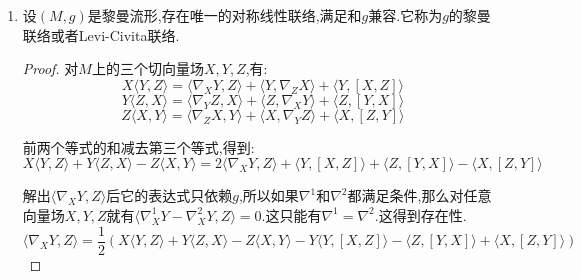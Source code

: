 \begin{enumerate}
    这是一个$(1,2)$型张量场(双线性映射$V\times V\to V$理解为$(1,2)$型张量场因为可以视为$V^*\times V\times V\to\mathbb{R}$的多重线性映射),称为$\nabla$的挠张量(torsion tensor).如果仿射联络$\nabla$的挠张量处处为零,就称$\nabla$是对称的或者无挠的(torsion-free).有如下互相等价的命题:
    \begin{enumerate}
    	\item $\nabla$是对称的.
    	\item $\nabla$关于坐标标架的克里斯托菲尔符号是对称的,即$\Gamma_{ij}^k=\Gamma_{ji}^k$(但是对非坐标标架可能不是对称的).
    	\item 对任意$M$上的光滑函数$u$,有$\nabla^2u$(共变Hessian)是对称$(0,2)$张量场.
    \end{enumerate}
    \begin{proof}
    	
    	(a)和(b)等价性.局部坐标下$\nabla$的挠张量可以写作$T_{ij}^k\partial_k\otimes\mathrm{d}x^i\otimes\mathrm{d}x^j$.这里$T_{ij}^k=\mathrm{d}x^k\left(\nabla_{\partial_i}\partial_j-\nabla_{\partial_j}\partial_i-[\partial_i,\partial_j]\right)=\Gamma_{ij}^k-\Gamma_{ji}^k$.
    \end{proof}
    \item 设$(M,g)$是黎曼流形,存在唯一的对称线性联络,满足和$g$兼容.它称为$g$的黎曼联络或者Levi-Civita联络.
    \begin{proof}
    	
    	对$M$上的三个切向量场$X,Y,Z$,有:
    	$$X\langle Y,Z\rangle=\langle\nabla_XY,Z\rangle+\langle Y,\nabla_ZX\rangle+\langle Y,[X,Z]\rangle$$
    	$$Y\langle Z,X\rangle=\langle\nabla_YZ,X\rangle+\langle Z,\nabla_XY\rangle+\langle Z,[Y,X]\rangle$$
    	$$Z\langle X,Y\rangle=\langle\nabla_ZX,Y\rangle+\langle X,\nabla_YZ\rangle+\langle X,[Z,Y]\rangle$$
    	
    	前两个等式的和减去第三个等式,得到:
    	$$X\langle Y,Z\rangle+Y\langle Z,X\rangle-Z\langle X,Y\rangle=2\langle\nabla_XY,Z\rangle+\langle Y,[X,Z]\rangle+\langle Z,[Y,X]\rangle-\langle X,[Z,Y]\rangle$$
    	
    	解出$\langle\nabla_XY,Z\rangle$后它的表达式只依赖$g$,所以如果$\nabla^1$和$\nabla^2$都满足条件,那么对任意向量场$X,Y,Z$就有$\langle\nabla_X^1Y-\nabla_X^2Y,Z\rangle=0$.这只能有$\nabla^1=\nabla^2$.这得到存在性.
    	$$\langle\nabla_XY,Z\rangle=\frac{1}{2}\left(X\langle Y,Z\rangle+Y\langle Z,X\rangle-Z\langle X,Y\rangle-Y\langle Y,[X,Z]\rangle-\langle Z,[Y,X]\rangle+\langle X,[Z,Y]\rangle\right)$$
    	

\end{proof}
\end{enumerate}
